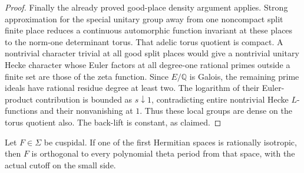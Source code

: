 \begin{proof}
Finally the already proved good-place density argument applies.
Strong approximation for the special unitary group away from one
noncompact split finite place reduces a continuous automorphic
function invariant at these places to the norm-one determinant
torus. That adelic torus quotient is compact. A nontrivial
character trivial at all good split places would give a
nontrivial unitary Hecke character whose Euler factors at all
degree-one rational primes outside a finite set are those of
the zeta function. Since \(E/\mathbb Q\) is Galois, the remaining
prime ideals have rational residue degree at least two.
The logarithm of their Euler-product contribution is bounded
as \(s\downarrow1\), contradicting entire nontrivial Hecke
\(L\)-functions and their nonvanishing at \(1\).
Thus these local groups are dense on the torus quotient also.
The back-lift is constant, as claimed.
\end{proof}

\begin{srproposition}
\label{prop:sr-theta-orthogonal-isotropic}
Let \(F\in\Sigma\) be cuspidal.
If one of the first Hermitian spaces is rationally isotropic,
then \(F\) is orthogonal to every polynomial theta period from
that space, with the actual cutoff on the small side.
\end{srproposition}

